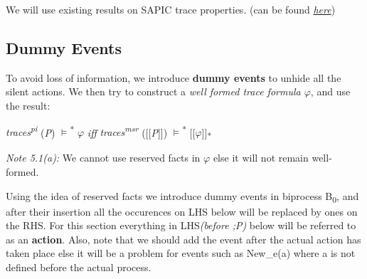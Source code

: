 \documentclass[11pt]{article}
\begin{document}
We will use existing results on SAPIC trace properties. (can be found \href{https://hal.archives-ouvertes.fr/hal-01337409v2/document}{\it {here}})

\subsection{Dummy Events}

To avoid loss of information, we introduce {\bf dummy events} to unhide all the silent actions. We then try to construct a {\it well formed trace formula $\varphi$}, and use the result:
\begin{center}
    {\it traces\textsuperscript{pi}} ({\it P}) $\models$\textsuperscript{*} $\varphi$ {\it iff}  {\it traces\textsuperscript{msr}} ([[{\it P}]]) $\models$\textsuperscript{*} [[$\varphi$]]\textsubscript{*}
\end{center}
{\it Note 5.1(a): }We cannot use reserved facts in $\varphi$ else it will not remain well-formed. \newline

Using the idea of reserved facts we introduce dummy events in biprocess B\textsubscript{0}, and after their insertion all the occurences on LHS below will be replaced by ones on the RHS. For this section everything in LHS{\it (before ;P)} below will be referred to as an {\bf action}.\newline 
\hspace*{14pt}Also, note that we should add the event after the actual action has taken place else it will be a problem for events such as New\_e(a) where a is not defined before the actual process.\newline 
\end{document}

